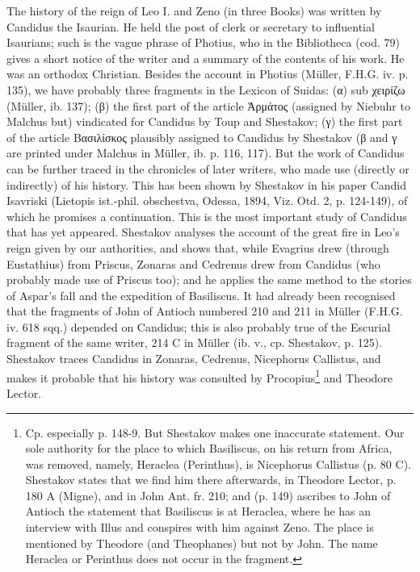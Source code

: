 
The history of the reign of Leo I. and Zeno (in three Books) was written by Candidus the Isaurian. He held the post of clerk or secretary to influential Isaurians; such is the vague phrase of Photius, who in the Bibliotheca (cod. 79) gives a short notice of the writer and a summary of the contents of his work. He was an orthodox Christian. Besides the account in Photius (Müller, F.H.G. iv. p. 135), we have probably three fragments in the Lexicon of Suidas: (\textgreek{α}) sub \textgreek{χειρίζω} (Müller, ib. 137); (\textgreek{β}) the first part of the article \textgreek{\texthebrew{Ἁ}ρμάτος} (assigned by Niebuhr to Malchus but) vindicated for Candidus by Toup and Shestakov; (\textgreek{γ}) the first part of the article \textgreek{Βασιλίσκος} plausibly assigned to Candidus by Shestakov (\textgreek{β} and \textgreek{γ} are printed under Malchus in Müller, ib. p. 116, 117). But the work of Candidus can be further traced in the chronicles of later writers, who made use (directly or indirectly) of his history. This has been shown by Shestakov in his paper Candid Isavriski (Lietopis ist.-phil. obschestva, Odessa, 1894, Viz. Otd. 2, p. 124-149), of which he promises a continuation. This is the most important study of Candidus that has yet appeared. Shestakov analyses the account of the great fire in Leo\texthebrew{}’s reign given by our authorities, and shows that, while Evagrius drew (through Eustathius) from Priscus, Zonaras and Cedrenus drew from Candidus (who probably made use of Priscus too); and he applies the same method to the stories of Aspar\texthebrew{}’s fall and the expedition of Basiliscus. It had already been recognised that the fragments of John of Antioch numbered 210 and 211 in Müller (F.H.G. iv. 618 sqq.) depended on Candidus; this is also probably true of the Escurial fragment of the same writer, 214 C in Müller (ib. v., cp. Shestakov, p. 125). Shestakov traces Candidus in Zonaras, Cedrenus, Nicephorus Callistus, and makes it probable that his history was consulted by Procopius\footnote{Cp. especially p. 148-9. But Shestakov makes one inaccurate statement. Our sole authority for the place to which Basiliscus, on his return from Africa, was removed, namely, Heraclea (Perinthus), is Nicephorus Callistus (p. 80 C). Shestakov states that we find him there afterwards, in Theodore Lector, p. 180 A (Migne), and in John Ant. fr. 210; and (p. 149) ascribes to John of Antioch the statement that Basiliscus is at Heraclea, where he has an interview with Illus and conspires with him against Zeno. The place is mentioned by Theodore (and Theophanes) but not by John. The name Heraclea or Perinthus does not occur in the fragment.} and Theodore Lector.

